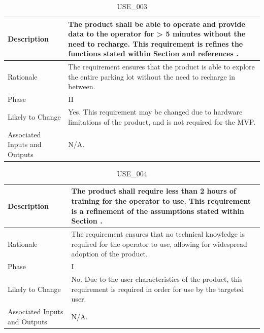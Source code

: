 \documentclass{article}
\begin{document}
\begin{table}[!h]
\begin{center}
\caption {USE\_003} 
\label{USE_003}
\begin{tabular}{ | m{3cm} | m{11cm} | }
\hline
Description & The product shall be able to operate and provide data to the operator for > 5 minutes without the need to recharge. This requirement is refines the functions stated within Section \nameref{subsec:ProdFunc} and references \nameref{MTNC_001}. \\
\hline
Rationale & The requirement ensures that the product is able to explore the entire parking lot without the need to recharge in between. \\
\hline
Phase & II \\
\hline
Likely to Change & Yes. This requirement may be changed due to hardware limitations of the product, and is not required for the MVP. \\
\hline
Associated Inputs and Outputs & N/A.  \\
\hline
\end{tabular}
\end{center}
\end{table}

\begin{table}[!h]
\begin{center}
\caption {USE\_004} 
\label{USE_004}
\begin{tabular}{ | m{3cm} | m{11cm} | }
\hline
Description & The product shall require less than 2 hours of training for the operator to use. This requirement is a refinement of the assumptions stated within Section \nameref{sec:Assumptions}. \\
\hline
Rationale & The requirement ensures that no technical knowledge is required for the operator to use, allowing for widespread adoption of the product. \\
\hline
Phase & I \\
\hline
Likely to Change & No. Due to the user characteristics of the product, this requirement is required in order for use by the targeted user. \\
\hline
Associated Inputs and Outputs & N/A.  \\
\hline
\end{tabular}
\end{center}
\end{table}
\end{document}
